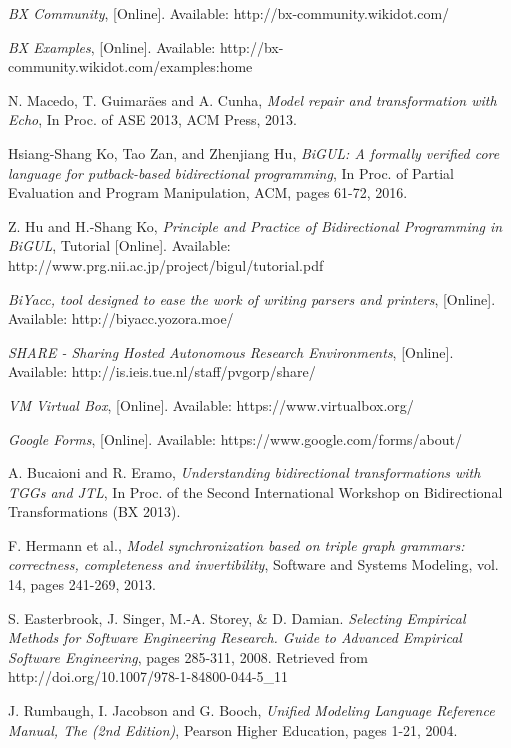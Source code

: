 \begin{thebibliography}{1}
	 {\em BX Community}, [Online]. Available: http://bx-community.wikidot.com/
	
	 {\em BX Examples}, [Online]. Available: http://bx-community.wikidot.com/examples:home
	
	 N. Macedo, T. Guimar\"aes and A. Cunha, {\em Model repair and transformation with Echo}, In Proc. of ASE 2013, ACM Press, 2013.
	
	 Hsiang-Shang Ko, Tao Zan, and Zhenjiang Hu, {\em BiGUL: A formally verified core language for putback-based bidirectional programming}, In Proc. of Partial Evaluation and Program Manipulation, ACM, pages 61-72,  2016.
	
	 Z. Hu and H.-Shang Ko,  {\em Principle and Practice of Bidirectional Programming in BiGUL}, Tutorial [Online]. Available: http://www.prg.nii.ac.jp/project/bigul/tutorial.pdf
	
	 {\em BiYacc, tool designed to ease the work of writing parsers and printers}, [Online]. Available: http://biyacc.yozora.moe/
	
	 {\em SHARE - Sharing Hosted Autonomous Research Environments}, [Online]. Available: http://is.ieis.tue.nl/staff/pvgorp/share/
	
	 {\em VM Virtual Box}, [Online]. Available: https://www.virtualbox.org/
	
	 {\em Google Forms}, [Online]. Available: https://www.google.com/forms/about/
	
	 A. Bucaioni and R. Eramo, {\em Understanding bidirectional transformations with TGGs and JTL}, In Proc. of the Second International Workshop on Bidirectional Transformations (BX 2013).
	
	 F. Hermann et al., {\em Model synchronization based on triple graph grammars: correctness, completeness and invertibility}, Software and Systems Modeling, vol. 14, pages 241-269, 2013.
	
	 S. Easterbrook, J. Singer, M.-A. Storey, \& D. Damian. {\em Selecting Empirical Methods for Software Engineering Research. Guide to Advanced Empirical Software Engineering}, pages 285-311, 2008. Retrieved from http://doi.org/10.1007/978-1-84800-044-5\_11
	
	 J. Rumbaugh, I. Jacobson and G. Booch, {\em Unified Modeling Language Reference Manual, The (2nd Edition)}, Pearson Higher Education, pages 1-21, 2004.
	

\end{thebibliography}

